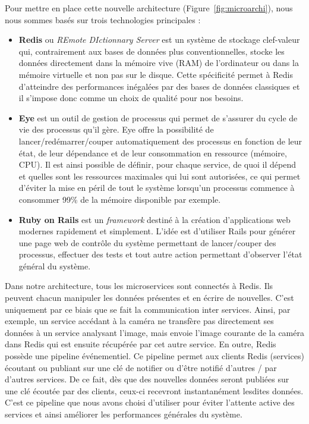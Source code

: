 Pour mettre en place cette nouvelle architecture (Figure~\ref{fig:microarchi}), nous nous sommes basés sur trois technologies principales :
\begin{itemize}
\item \textbf{Redis}\cite{redis} ou \emph{REmote DIctionnary Server} est un système de stockage clef-valeur qui, contrairement aux bases de données plus conventionnelles, stocke les données directement dans la mémoire vive (RAM) de l'ordinateur ou dans la mémoire virtuelle et non pas sur le disque. Cette spécificité permet à Redis d'atteindre des performances inégalées par des bases de données classiques et il s'impose donc comme un choix de qualité pour nos besoins.
\item \textbf{Eye}\cite{eye} est un outil de gestion de processus qui permet de s'assurer du cycle de vie des processus qu'il gère. Eye offre la possibilité de lancer/redémarrer/couper automatiquement des processus en fonction de leur état, de leur dépendance et de leur consommation en ressource (mémoire, CPU). Il est ainsi possible de définir, pour chaque service, de quoi il dépend et quelles sont les ressources maximales qui lui sont autorisées, ce qui permet d'éviter la mise en péril de tout le système lorsqu'un processus commence à consommer 99\% de la mémoire disponible par exemple.
\item \textbf{Ruby on Rails}\cite{rubyrails} est un \emph{framework} destiné à la création d'applications web modernes rapidement et simplement. L'idée est d'utiliser Rails pour générer une page web de contrôle du système permettant de lancer/couper des processus, effectuer des tests et tout autre action permettant d'observer l'état général du système.
\end{itemize}

Dans notre architecture, tous les microservices sont connectés à Redis. Ils peuvent chacun manipuler les données présentes et en écrire de nouvelles. C'est uniquement par ce biais que se fait la communication inter services. Ainsi, par exemple, un service accédant à la caméra ne transfère pas directement ses données à un service analysant l'image, mais envoie l'image courante de la caméra dans Redis qui est ensuite récupérée par cet autre service. En outre, Redis possède une pipeline événementiel. Ce pipeline permet aux clients Redis (services) écoutant ou publiant sur une clé de notifier ou d'être notifié d'autres / par d'autres services. De ce fait, dès que des nouvelles données seront publiées sur une clé écoutée par des clients, ceux-ci recevront instantanément lesdites données. C'est ce pipeline que nous avons choisi d'utiliser pour éviter l'attente active des services et ainsi améliorer les performances générales du système.

